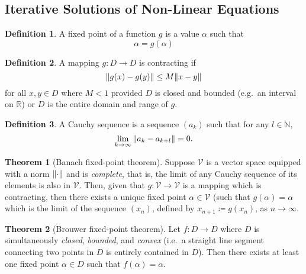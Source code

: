 \documentclass[11pt,letterpaper]{article}
\numberwithin{figure}{section} %
\newcommand{\Naturals}{\mathbb{N}}
\newcommand{\Reals}{\mathbb{R}}
\newcommand{\keyword}[1]{\colorbox{cyan!20!}{#1}}
\theoremstyle{definition}
\theoremstyle{definition}
\newtheorem*{theorem*}{Theorem}
\theoremstyle{definition}
\theoremstyle{definition}
\newtheorem{definition}{Definition}[subsection]
\theoremstyle{definition}
\theoremstyle{remark}
\theoremstyle{remark}
\theoremstyle{definition}
\theoremstyle{remark}
\theoremstyle{remark}
\begin{document}
\begin{multicols*}{3}
\section{Iterative Solutions of Non-Linear Equations}
\begin{definition}
	A \keyword{fixed point} of a function $g$ is a value $\alpha$ such that
	\[
		\alpha = g(\alpha)
	\]
\end{definition}
\begin{definition}
	A mapping $g: D \to D$ is \keyword{contracting} if
	\[
		\norm{g(x) - g(y)} \leq M \norm{x - y}	
	\]
	for all $x, y \in D$ where $M < 1$ provided $D$ is closed and bounded (e.g.\
	an interval on $\Reals$) or $D$ is the entire domain and range of $g$.
\end{definition}
\begin{definition}
	A \keyword{Cauchy sequence} is a sequence $(a_k)$ such that for any $l \in
	\Naturals$,
	\[
		\lim_{k\to\infty} \norm{a_k - a_{k+l}} = 0.
	\]
\end{definition}
\begin{theorem*}[Banach fixed-point theorem]
	Suppose $\mathcal{V}$ is a vector space equipped with a norm $\norm{\cdot}$ and is
	\textit{complete}, that is, the limit of any Cauchy sequence of its elements
	is also in $\mathcal{V}$. Then, given that $g: \mathcal{V} \to \mathcal{V}$ is
	a mapping which is contracting, then there exists a unique fixed point
	$\alpha \in \mathcal{V}$ (such that $g(\alpha) = \alpha$ which is the limit
	of the sequence $(x_n)$, defined by $x_{n+1} \coloneqq g(x_n)$, as $n \to
	\infty$.
\end{theorem*}
\begin{theorem*}[Brouwer fixed-point theorem]
	Let $f : D \to D$ where $D$ is simultaneously \emph{closed}, \emph{bounded}, and
	\emph{convex} (i.e.\ a straight line segment connecting two points in $D$ is
	entirely contained in $D$). Then there exists at least one fixed point
	$\alpha \in D$ such that $f(\alpha) = \alpha$.
\end{theorem*}

\end{multicols*}
\end{document}
